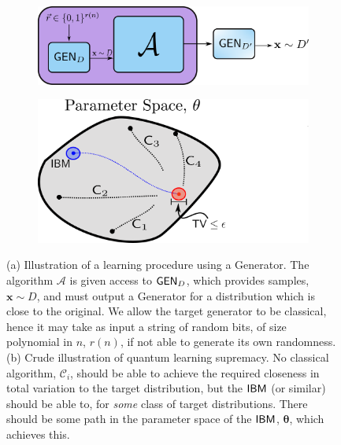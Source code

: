 \begin{figure}[ht]
\centering
%
\begin{subfigure}[t]{0.5\textwidth}
    \includegraphics[width=\textwidth, height = 0.3\textwidth]{images/FIG_5a_generator.pdf}
    \caption{}\label{subfig:generator}
\end{subfigure}
%
\qquad
\begin{subfigure}[t]{0.4\textwidth}
        \includegraphics[width=\textwidth, height = 0.5\textwidth]{images/FIG_5b_tv_hardness_parameter_space.pdf}
    \caption{}
    \label{subfig:qlsillustration}
\end{subfigure}
\caption{
(a) Illustration of a learning procedure using a Generator. The algorithm 
$\mathcal A$ is given access to $\operatorname{\textsf{GEN}}_D$, which provides samples, $\mathbf{x}\sim D$, and must output a Generator for a distribution which is close to the original. We allow the target generator to be classical, hence it may take as input a string of random bits, of size polynomial in $n$, $r(n)$, if not able to generate its own randomness. (b) Crude illustration of quantum learning supremacy. No classical algorithm, $\mathcal{C}_i$, should be able to achieve the required closeness in total variation to the target distribution, but the $\textsf{IBM}$ (or similar) should be able to, for \textit{some} class of target distributions. There should be some path in the parameter space of the $\textsf{IBM}$, $\boldsymbol\theta$, which achieves this.
}\label{fig:learning_supremacy}
\end{figure}


